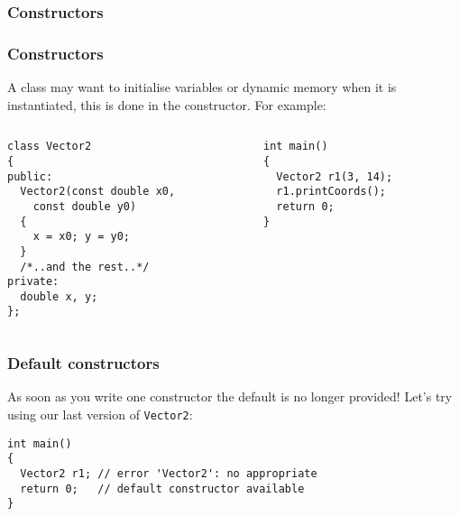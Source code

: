 \documentclass{beamer}
\begin{document}
\subsubsection{Constructors}

\begin{frame}[fragile]
  \frametitle{Constructors}
  
  A class may want to initialise variables or dynamic memory when it is instantiated, this is done in the constructor.
  \pause
  For example:
  \begin{columns}[t]
    \begin{column}[T]{0.5\linewidth}
      \begin{lstlisting}[aboveskip=0pt,belowskip=0pt]
class Vector2
{
public:
  Vector2(const double x0,
    const double y0)
  {
    x = x0; y = y0;
  }
  /*..and the rest..*/
private:
  double x, y;
};
      \end{lstlisting}
    \end{column}
    \begin{column}[T]{0.5\linewidth}
      \begin{lstlisting}[aboveskip=0pt,belowskip=0pt]
int main()
{
  Vector2 r1(3, 14);
  r1.printCoords();
  return 0;
}
      \end{lstlisting}
    \end{column}
  \end{columns}  
	
\end{frame}

\begin{frame}[fragile]
  \frametitle{Default constructors}
  
  As soon as you write one constructor the default is no longer provided!\newline
  \pause
  Let's try using our last version of \texttt{Vector2}:
  \begin{lstlisting}
int main()
{
  Vector2 r1; // error 'Vector2': no appropriate
  return 0;	  // default constructor available
}
  \end{lstlisting}

\end{frame}
\end{document}
